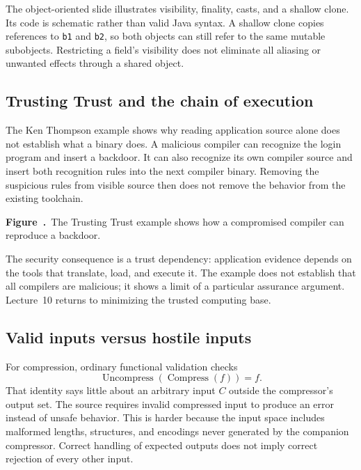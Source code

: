 \documentclass[11pt,a4paper]{article}
\newcommand{\source}[2]{\textcolor{muted}{\small\textit{Source:} \nolinkurl{#1}; physical PDF pp.~#2.}\par\medskip}
\numberwithin{figure}{section}
\newcommand{\diagramcaption}[1]{\par\smallskip\refstepcounter{figure}\begin{center}\small\textbf{Figure~\thefigure.}~#1\end{center}}
\begin{document}
The object-oriented slide illustrates visibility, finality, casts, and a shallow clone. Its code is schematic rather than valid Java syntax. A shallow clone copies references to \texttt{b1} and \texttt{b2}, so both objects can still refer to the same mutable subobjects. Restricting a field's visibility does not eliminate all aliasing or unwanted effects through a shared object.

\subsection{Trusting Trust and the chain of execution}
The Ken Thompson example shows why reading application source alone does not establish what a binary does. A malicious compiler can recognize the login program and insert a backdoor. It can also recognize its own compiler source and insert both recognition rules into the next compiler binary. Removing the suspicious rules from visible source then does not remove the behavior from the existing toolchain.

\begin{center}\end{center}
\diagramcaption{The Trusting Trust example shows how a compromised compiler can reproduce a backdoor.}

The security consequence is a trust dependency: application evidence depends on the tools that translate, load, and execute it. The example does not establish that all compilers are malicious; it shows a limit of a particular assurance argument. Lecture~10 returns to minimizing the trusted computing base.

\subsection{Valid inputs versus hostile inputs}
For compression, ordinary functional validation checks
\[
\operatorname{Uncompress}(\operatorname{Compress}(f))=f.
\]
That identity says little about an arbitrary input $C$ outside the compressor's output set. The source requires invalid compressed input to produce an error instead of unsafe behavior. This is harder because the input space includes malformed lengths, structures, and encodings never generated by the companion compressor. Correct handling of expected outputs does not imply correct rejection of every other input.
\end{document}
